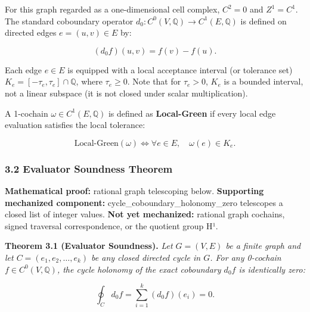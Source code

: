 \documentclass[
  10pt,
]{article}
\begin{document}
For this graph regarded as a one-dimensional cell complex, \hypertarget{math-E0071-0086}{}{\(C^2=0\)} and \hypertarget{math-E0072-0087}{}{\(Z^1=C^1\)}. The standard coboundary operator \hypertarget{math-E0073-0088}{}{\(d_0: C^0(V, \mathbb{Q}) \to C^1(E, \mathbb{Q})\)} is defined on directed edges \hypertarget{math-E0074-0089}{}{\(e = (u, v) \in E\)} by:

\hypertarget{math-E0075-0090}{}{\[(d_0 f)(u, v) = f(v) - f(u).\]}

Each edge \hypertarget{math-E0076-0091}{}{\(e \in E\)} is equipped with a local acceptance interval (or tolerance set) \hypertarget{math-E0077-0092}{}{\(K_e = [-\tau_e, \tau_e] \cap \mathbb{Q}\)}, where \hypertarget{math-E0078-0093}{}{\(\tau_e \ge 0\)}. Note that for \hypertarget{math-E0079-0094}{}{\(\tau_e > 0\)}, \hypertarget{math-E0080-0095}{}{\(K_e\)} is a bounded interval, not a linear subspace (it is not closed under scalar multiplication).

A 1-cochain \hypertarget{math-E0081-0096}{}{\(\omega \in C^1(E, \mathbb{Q})\)} is defined as \textbf{Local-Green} if every local edge evaluation satisfies the local tolerance:

\hypertarget{math-E0082-0097}{}{\[\text{Local-Green}(\omega) \iff \forall e \in E,\quad \omega(e) \in K_e.\]}

\subsubsection{3.2 Evaluator Soundness Theorem}\label{evaluator-soundness-theorem}

\textbf{Mathematical proof:} rational graph telescoping below. \textbf{Supporting mechanized component:} cycle\_coboundary\_holonomy\_zero telescopes a closed list of integer values. \textbf{Not yet mechanized:} rational graph cochains, signed traversal correspondence, or the quotient group H¹.

\textbf{Theorem 3.1 (Evaluator Soundness).} \emph{Let \hypertarget{math-E0062-0098}{}{\(G = (V, E)\)} be a finite graph and let \hypertarget{math-E0083-0099}{}{\(C = (e_1, e_2, \ldots, e_k)\)} be any closed directed cycle in \hypertarget{math-E0084-0100}{}{\(G\)}. For any 0-cochain \hypertarget{math-E0085-0101}{}{\(f \in C^0(V, \mathbb{Q})\)}, the cycle holonomy of the exact coboundary \hypertarget{math-E0086-0102}{}{\(d_0 f\)} is identically zero:}

\hypertarget{math-E0087-0103}{}{\[\oint_C d_0 f = \sum_{i=1}^k (d_0 f)(e_i) = 0.\]}
\end{document}

